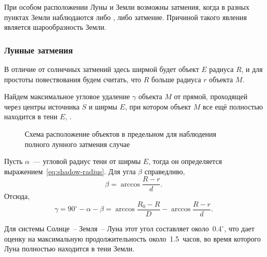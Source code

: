 % 
%
%    
При особом расположении Луны и Земли возможны  затмения, когда в разных пунктах Земли наблюдаются либо , либо  затмение. Причиной такого явления является шарообразность Земли.

\subsubsection*{Лунные затмения}
В отличие от солнечных затмений здесь ширмой будет объект $E$ радиуса $R$, и для простоты повествования будем считать, что $R$ больше радиуса $r$ объекта $M$. 

Найдем максимальное угловое удаление $\gamma$ объекта $M$ от прямой, проходящей через центры источника $S$ и ширмы $E$, при котором объект $M$ все ещё полностью находится в тени $E$, .

\begin{figure}[h!]
    \centering
    
    \caption{Схема расположение объектов в предельном для наблюдения полного лунного затмения случае}
    \label{pic:eclipses-full-lunar-eslipse}
\end{figure}

Пусть $\alpha$~--- угловой радиус тени от ширмы $E$, тогда он определяется выражением~\eqref{eq:shadow-radius}. Для угла $\beta$ справедливо,
\begin{equation}
    \beta = \arccos \frac{R - r}{d}.
    \label{eq:eclipses-lunar-beta}
\end{equation}
Отсюда,
\begin{equation*}
    \gamma = 90^\circ - \alpha - \beta = \arccos \frac{R_0 - R}{D} - \arccos \frac{R - r}{d}.
\end{equation*}

Для системы Солнце~-- Земля~-- Луна этот угол составляет около~$0.4^\circ$, что дает оценку на максимальную продолжительность  около~1.5~часов, во время которого Луна полностью находится в тени Земли.

